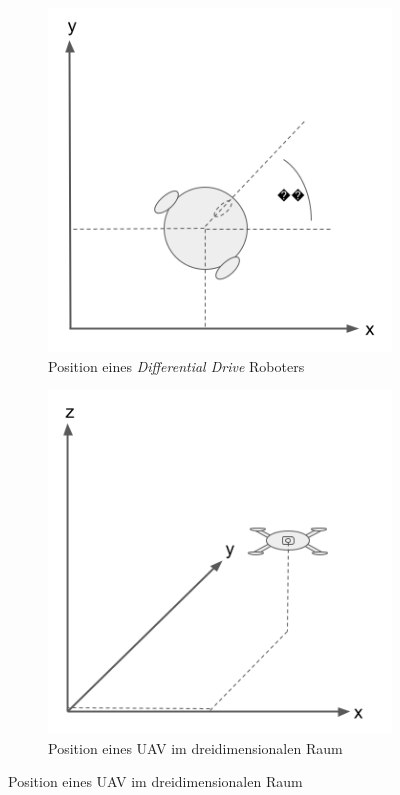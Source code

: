\mbox{}
\begin{figure}
  \begin{subfigure}[t]{.3\textwidth}
    \centering
    \includegraphics[width=.8\linewidth]{pic/vorwissen/1a_diffdrive.png}
    \caption{Position eines \textit{Differential Drive} Roboters}
    \label{fig:1a_dd}
  \end{subfigure}\hfill
  \begin{subfigure}[t]{.3\textwidth}
    \centering
    \includegraphics[width=.8\linewidth]{pic/vorwissen/1b_uav.png}
    \caption{Position eines UAV im dreidimensionalen Raum}
    \label{fig:1b_uav}
  \end{subfigure}\hfill

\end{figure}
